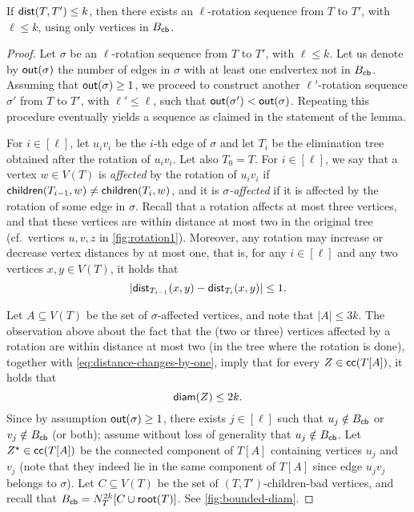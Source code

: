 \documentclass[a4paper,UKenglish,cleveref, autoref, thm-restate]{lipics-v2021}
\newcommand{\child}{{\sf children}\xspace}
\renewcommand{\root}{{\sf root}\xspace}
\newcommand{\dist}{{\sf dist}\xspace}
\newcommand{\diam}{{\sf diam}\xspace}
\newcommand{\Bcb}{B_{\sf cb}\xspace}
\begin{document}
\begin{lemma}\label{lemma:restriction-to-balls}
If $\dist(T,T')\leq k$, then there exists an $\ell$-rotation sequence from $T$ to $T'$, with $\ell \leq k$, using only vertices in $\Bcb$.
\end{lemma}
\begin{proof}
Let $\sigma$  be an $\ell$-rotation sequence from $T$ to $T'$, with $\ell \leq k$. Let us denote by ${\sf out}(\sigma)$ the number of edges in $\sigma$ with at least one endvertex not in $\Bcb$. Assuming that ${\sf out}(\sigma) \geq 1$, we proceed to construct another $\ell'$-rotation sequence $\sigma'$ from $T$ to $T'$, with $\ell' \leq \ell$, such that ${\sf out}(\sigma') < {\sf out}(\sigma)$. Repeating this procedure eventually yields a sequence as claimed in the statement of the lemma.


For $i \in [\ell]$, let $u_iv_i$ be the $i$-th edge of $\sigma$ and let $T_i$  be the elimination tree obtained after the rotation of $u_iv_i$. Let also $T_0=T$. For $i \in [\ell]$, we say that a vertex $w \in V(T)$ is \textit{affected} by the rotation of $u_iv_i$ if $\child(T_{i-1},w) \neq \child(T_{i},w)$, and it is \textit{$\sigma$-affected} if it is affected by the rotation of some edge in $\sigma$. Recall that a rotation affects at most three vertices, and that these vertices are within distance at most two in the original tree (cf.~vertices $u,v,z$ in \autoref{fig:rotation1}). Moreover, any rotation may increase or decrease vertex distances by at most one, that is, for any $i \in [\ell]$ and any two vertices $x,y \in V(T)$, it holds that
\begin{equation}\label{eq:distance-changes-by-one}
|\dist_{T_{i-1}}(x,y) - \dist_{T_{i}}(x,y)| \leq 1.
\end{equation}

Let $A \subseteq V(T)$ be the set of $\sigma$-affected vertices, and note that $|A| \leq 3k$. The observation above about the fact that the (two or three) vertices affected by a rotation are within distance at most two (in the tree where the rotation is done), together with \autoref{eq:distance-changes-by-one}, imply that for every $Z \in {\sf cc}(T[A])$, it holds that
\begin{equation}\label{eq:Z-bounded-diameter}
\diam(Z) \leq 2k.
\end{equation}
Since by assumption ${\sf out}(\sigma) \geq 1$, there exists $j \in [\ell]$ such that $u_j  \notin \Bcb$ or $v_j  \notin \Bcb$ (or both); assume without loss of generality that $u_j  \notin \Bcb$. Let $Z^{\star} \in {\sf cc}(T[A])$ be the connected component of $T[A]$ containing vertices $u_j$ and $v_j$ (note that they indeed lie in the same component of $T[A]$ since edge $u_jv_j$ belongs to $\sigma$). Let $C \subseteq V(T)$ be the set of $(T,T')$-children-bad vertices, and recall that $\Bcb=N_T^{2k}[C \cup \root(T)]$. See \autoref{fig:bounded-diam}.



\end{proof}
\end{document}
